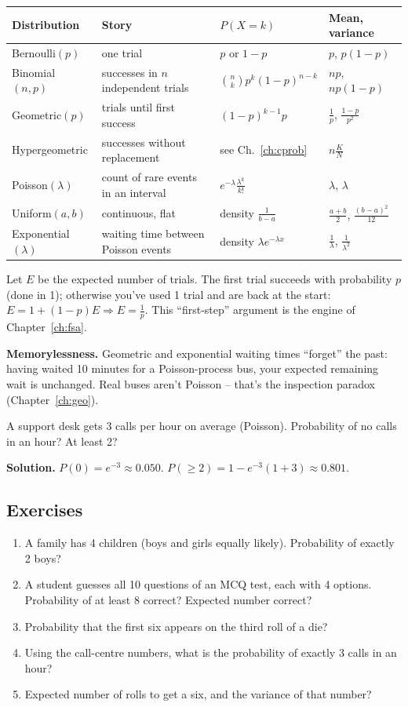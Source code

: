 \documentclass[11pt,a4paper,openany]{report}
\newenvironment{exercises}{\subsection*{Exercises \thechapter}\begin{enumerate}[label=\textbf{\thechapter.\arabic*},leftmargin=3.2em]}{\end{enumerate}}
\newcommand{\C}[2]{\binom{#1}{#2}}
\begin{document}
\begin{center}\small
\begin{tabular}{llll}
\toprule
Distribution & Story & $P(X=k)$ & Mean, variance\\\midrule
Bernoulli$(p)$ & one trial & $p$ or $1-p$ & $p$, $p(1-p)$\\
Binomial$(n,p)$ & successes in $n$ independent trials & $\C nk p^k(1-p)^{n-k}$ & $np$, $np(1-p)$\\
Geometric$(p)$ & trials until first success & $(1-p)^{k-1}p$ & $\frac1p$, $\frac{1-p}{p^2}$\\
Hypergeometric & successes without replacement & see Ch.~\ref{ch:cprob} & $n\frac KN$\\
Poisson$(\lambda)$ & count of rare events in an interval & $e^{-\lambda}\frac{\lambda^k}{k!}$ & $\lambda$, $\lambda$\\
Uniform$(a,b)$ & continuous, flat & density $\frac1{b-a}$ & $\frac{a+b}2$, $\frac{(b-a)^2}{12}$\\
Exponential$(\lambda)$ & waiting time between Poisson events & density $\lambda e^{-\lambda x}$ & $\frac1\lambda$, $\frac1{\lambda^2}$\\
\bottomrule
\end{tabular}
\end{center}

\begin{why}
Let $E$ be the expected number of trials. The first trial succeeds with probability $p$ (done in 1); otherwise you've used 1 trial and are back at the start: $E=1+(1-p)E\Rightarrow E=\frac1p$. This ``first-step'' argument is the engine of Chapter~\ref{ch:fsa}.
\end{why}

\textbf{Memorylessness.} Geometric and exponential waiting times ``forget'' the past: having waited 10 minutes for a Poisson-process bus, your expected remaining wait is unchanged. Real buses aren't Poisson -- that's the inspection paradox (Chapter~\ref{ch:geo}).

\begin{example}
A support desk gets 3 calls per hour on average (Poisson). Probability of no calls in an hour? At least 2?

\textbf{Solution.} $P(0)=e^{-3}\approx\mathbf{0.050}$. $P(\ge2)=1-e^{-3}(1+3)\approx\mathbf{0.801}$.
\end{example}

\begin{exercises}
\item A family has 4 children (boys and girls equally likely). Probability of exactly 2 boys?
\item A student guesses all 10 questions of an MCQ test, each with 4 options. Probability of at least 8 correct? Expected number correct?
\item Probability that the first six appears on the third roll of a die?
\item Using the call-centre numbers, what is the probability of exactly 3 calls in an hour?
\item Expected number of rolls to get a six, and the variance of that number?
\end{exercises}
\end{document}
